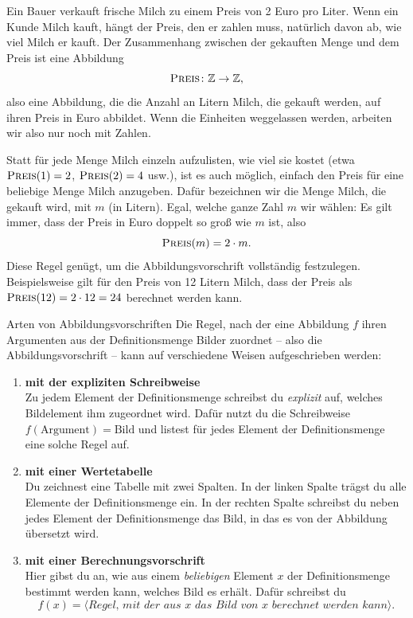 \documentclass[../../main.tex]{subfiles}
\begin{document}
\begin{example}
    Ein Bauer verkauft frische Milch zu einem Preis von 2 Euro pro Liter. Wenn ein Kunde Milch kauft, hängt der Preis, den er zahlen muss, natürlich davon ab, wie viel Milch er kauft. Der Zusammenhang zwischen der gekauften Menge und dem Preis ist eine Abbildung \[\textsc{Preis}\colon\mathbb{Z}\rightarrow\mathbb{Z},\] also eine Abbildung, die die Anzahl an Litern Milch, die gekauft werden, auf ihren Preis in Euro abbildet. Wenn die Einheiten weggelassen werden, arbeiten wir also nur noch mit Zahlen. 
    
    Statt für jede Menge Milch einzeln aufzulisten, wie viel sie kostet (etwa \mbox{$\textsc{Preis}(1)=2$}, $\textsc{Preis}(2)=4$ usw.), ist es auch möglich, einfach den Preis für eine beliebige Menge Milch anzugeben. Dafür bezeichnen wir die Menge Milch, die gekauft wird, mit $m$ (in Litern). Egal, welche ganze Zahl $m$ wir wählen: Es gilt immer, dass der Preis in Euro doppelt so groß wie $m$ ist, also \[\textsc{Preis}(m)=2\cdot m.\]
    Diese Regel genügt, um die Abbildungsvorschrift vollständig festzulegen. Beispielsweise gilt für den Preis von 12 Litern Milch, dass der Preis als \mbox{$\textsc{Preis}(12)=2\cdot 12=24$} berechnet werden kann.
\end{example}


\begin{nutshell}{Arten von Abbildungsvorschriften}
    Die Regel, nach der eine Abbildung $f$ ihren Argumenten aus der Definitionsmenge Bilder zuordnet -- also die Abbildungsvorschrift -- kann auf verschiedene Weisen aufgeschrieben werden:
    \begin{enumerate}[label=\textbf{(\arabic*)}]
        \item \textbf{mit der expliziten Schreibweise}\\
            \sloppy
            Zu jedem Element der Definitionsmenge schreibst du \emph{explizit} auf, welches Bildelement ihm zugeordnet wird. Dafür nutzt du die Schreibweise \mbox{$f(\text{Argument})=\text{Bild}$} und listest für jedes Element der Definitionsmenge eine solche Regel auf.
        
            \fussy
        \item \textbf{mit einer Wertetabelle}\\
            Du zeichnest eine Tabelle mit zwei Spalten. In der linken Spalte trägst du alle Elemente der Definitionsmenge ein. In der rechten Spalte schreibst du neben jedes Element der Definitionsmenge das Bild, in das es von der Abbildung übersetzt wird.
        
        \item \textbf{mit einer Berechnungsvorschrift}\\
            Hier gibst du an, wie aus einem \emph{beliebigen} Element $x$ der Definitionsmenge bestimmt werden kann, welches Bild es erhält. Dafür schreibst du
            \[f(x)=\langle\textit{Regel, mit der aus $x$ das Bild von $x$ berechnet werden kann}\rangle.\]
    \end{enumerate}
\end{nutshell}
\end{document}
